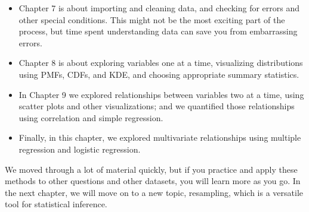 \begin{itemize}
\item
  Chapter 7 is about importing and cleaning data, and checking for
  errors and other special conditions. This might not be the most
  exciting part of the process, but time spent understanding data can
  save you from embarrassing errors.
\item
  Chapter 8 is about exploring variables one at a time, visualizing
  distributions using PMFs, CDFs, and KDE, and choosing appropriate
  summary statistics.
\item
  In Chapter 9 we explored relationships between variables two at a
  time, using scatter plots and other visualizations; and we quantified
  those relationships using correlation and simple regression.
\item
  Finally, in this chapter, we explored multivariate relationships using
  multiple regression and logistic regression.
\end{itemize}

We moved through a lot of material quickly, but if you practice and
apply these methods to other questions and other datasets, you will
learn more as you go. In the next chapter, we will move on to a new
topic, resampling, which is a versatile tool for statistical inference.


